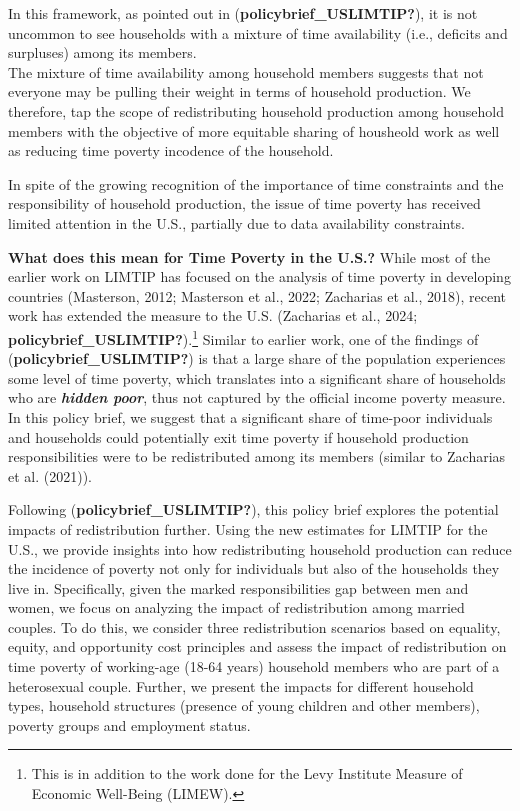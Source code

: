 \documentclass[
  11pt,
]{article}
\begin{document}
In this framework, as pointed out in (\textbf{policybrief\_USLIMTIP?}),
it is not uncommon to see households with a mixture of time availability
(i.e., deficits and surpluses) among its members.\\
The mixture of time availability among household members suggests that
not everyone may be pulling their weight in terms of household
production. We therefore, tap the scope of redistributing household
production among household members with the objective of more equitable
sharing of housheold work as well as reducing time poverty incodence of
the household.

In spite of the growing recognition of the importance of time
constraints and the responsibility of household production, the issue of
time poverty has received limited attention in the U.S., partially due
to data availability constraints.

\textbf{What does this mean for Time Poverty in the U.S.?} While most of
the earlier work on LIMTIP has focused on the analysis of time poverty
in developing countries (Masterson, 2012; Masterson et al., 2022;
Zacharias et al., 2018), recent work has extended the measure to the
U.S. (Zacharias et al., 2024;
\textbf{policybrief\_USLIMTIP?}).\footnote{This is in addition to the
  work done for the Levy Institute Measure of Economic Well-Being
  (LIMEW).} Similar to earlier work, one of the findings of
(\textbf{policybrief\_USLIMTIP?}) is that a large share of the
population experiences some level of time poverty, which translates into
a significant share of households who are \textbf{\emph{hidden poor}},
thus not captured by the official income poverty measure. In this policy
brief, we suggest that a significant share of time-poor individuals and
households could potentially exit time poverty if household production
responsibilities were to be redistributed among its members (similar to
Zacharias et al. (2021)).

Following (\textbf{policybrief\_USLIMTIP?}), this policy brief explores
the potential impacts of redistribution further. Using the new estimates
for LIMTIP for the U.S., we provide insights into how redistributing
household production can reduce the incidence of poverty not only for
individuals but also of the households they live in. Specifically, given
the marked responsibilities gap between men and women, we focus on
analyzing the impact of redistribution among married couples. To do
this, we consider three redistribution scenarios based on equality,
equity, and opportunity cost principles and assess the impact of
redistribution on time poverty of working-age (18-64 years) household
members who are part of a heterosexual couple. Further, we present the
impacts for different household types, household structures (presence of
young children and other members), poverty groups and employment status.
\end{document}
